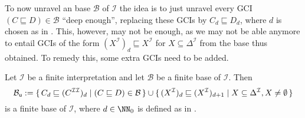 To now unravel an \ELgfpbot base $\mathcal{B}$ of $\mathcal{I}$ the idea is to just
unravel every GCI $(C \sqsubseteq D) \in \mathcal{B}$ ``deep enough'', \ie replacing these
GCIs by $C_d \sqsubseteq D_d$, where $d$ is chosen as in .
This, however, may not be enough, as we may not be able anymore to entail GCIs of the form
$(X^{\mathcal{I}})_d \sqsubseteq X^{\mathcal{I}}$ for $X \subseteq \Delta^{\mathcal{I}}$
from the base thus obtained.  To remedy this, some extra GCIs need to be added.

\begin{Theorem}
  \label{thm:unravelling-ELgfpbot-bases}
  Let $\mathcal{I}$ be a finite interpretation and let $\mathcal{B}$ be a finite \ELgfpbot
  base of $\mathcal{I}$.  Then
  \begin{equation*}
    \mathcal{B}_{\mathsf{u}} := {\{\, C_d \sqsubseteq (C^{\mathcal{I}\mathcal{I}})_d \mid (C
      \sqsubseteq D) \in \mathcal{B} \,\}} \cup {\ensuremath{\{\, (X^{\mathcal{I}})_d \sqsubseteq
      (X^{\mathcal{I}})_{d+1} \mid X \subseteq \Delta^{\mathcal{I}}, X \neq \emptyset \,\}}}
  \end{equation*}
  is a finite \ELbot base of $\mathcal{I}$, where $d \in \NN_0$ is defined as in
  .
\end{Theorem}


